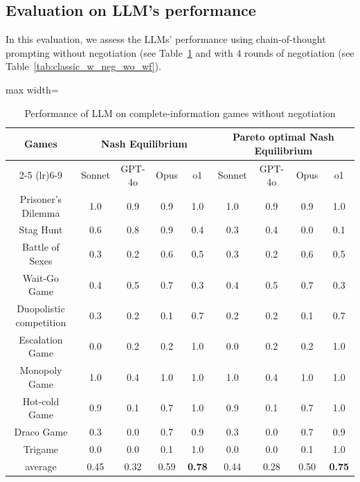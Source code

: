 \subsection{Evaluation on LLM's performance}
\label{sec:eval}
In this evaluation, we assess the LLMs' performance using chain-of-thought prompting without negotiation (see Table~\ref{tab:classic_wo_neg_wo_wf} and with 4 rounds of negotiation (see Table~\ref{tab:classic_w_neg_wo_wf}).

\begin{table}[!ht]
    \centering
    \begin{adjustbox}{max width=\textwidth}
    \begin{tabular}{cc c c c c c c c}
    \toprule
       \multirow{2.5}{*}{\textbf{Games}} & \multicolumn{4}{c}{\bf Nash Equilibrium} & \multicolumn{4}{c}{\bf Pareto optimal Nash Equilibrium} \\ \cmidrule(lr){2-5}  \cmidrule(lr){6-9} 
           & Sonnet & GPT-4o & Opus & o1 & Sonnet & GPT-4o & Opus & o1  \\
        \midrule
        Prisoner's Dilemma & 1.0 & 0.9 & 0.9 & 1.0 & 1.0 & 0.9 & 0.9 & 1.0 \\
        Stag Hunt & 0.6 & 0.8 & 0.9 & 0.4 & 0.3 & 0.4 & 0.0 & 0.1\\
        Battle of Sexes & 0.3 & 0.2 & 0.6 & 0.5 & 0.3 & 0.2 & 0.6 & 0.5\\
        Wait-Go Game & 0.4 & 0.5 & 0.7 & 0.3 & 0.4 & 0.5 & 0.7 & 0.3\\
        Duopolistic competition & 0.3 & 0.2 & 0.1 & 0.7 & 0.2 & 0.2 & 0.1 & 0.7\\
        Escalation Game & 0.0 & 0.2 & 0.2 & 1.0 & 0.0 & 0.2 & 0.2 & 1.0\\
        Monopoly Game & 1.0 & 0.4 & 1.0 & 1.0 & 1.0 & 0.4 & 1.0 & 1.0\\
        Hot-cold Game & 0.9 & 0.1 & 0.7 & 1.0 & 0.9 & 0.1 & 0.7 & 1.0 \\
        Draco Game & 0.3 & 0.0 & 0.7 & 0.9 & 0.3 & 0.0 & 0.7 & 0.9\\
        Trigame & 0.0 & 0.0 & 0.1 & 1.0 & 0.0 & 0.0 & 0.1 & 1.0\\
        \midrule
        average & 0.45 & 0.32 & 0.59 & \textbf{0.78} & 0.44 & 0.28 & 0.50 & \textbf{0.75}\\
        \bottomrule
    \end{tabular}
    \end{adjustbox}
    \caption{Performance of LLM on complete-information games without negotiation}
    \label{tab:classic_wo_neg_wo_wf}
\end{table}

